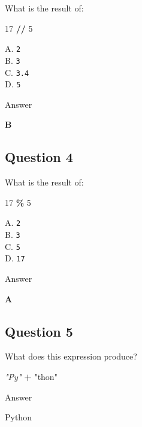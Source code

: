 \documentclass[
]{article}
\newenvironment{Shaded}{\begin{snugshade}}{\end{snugshade}}
\newcommand{\CommentTok}[1]{\textcolor[rgb]{0.56,0.35,0.01}{\textit{#1}}}
\newcommand{\DecValTok}[1]{\textcolor[rgb]{0.00,0.00,0.81}{#1}}
\newcommand{\NormalTok}[1]{#1}
\newcommand{\OperatorTok}[1]{\textcolor[rgb]{0.81,0.36,0.00}{\textbf{#1}}}
\newcommand{\StringTok}[1]{\textcolor[rgb]{0.31,0.60,0.02}{#1}}
\begin{document}
What is the result of:

\begin{Shaded}
\begin{Highlighting}[]
\DecValTok{17} \OperatorTok{//} \DecValTok{5}
\end{Highlighting}
\end{Shaded}

A. \texttt{2}\\
B. \texttt{3}\\
C. \texttt{3.4}\\
D. \texttt{5}

Answer

\textbf{B}

\subsection{Question 4}\label{question-4-4}

What is the result of:

\begin{Shaded}
\begin{Highlighting}[]
\DecValTok{17} \OperatorTok{\%} \DecValTok{5}
\end{Highlighting}
\end{Shaded}

A. \texttt{2}\\
B. \texttt{3}\\
C. \texttt{5}\\
D. \texttt{17}

Answer

\textbf{A}

\subsection{Question 5}\label{question-5-4}

What does this expression produce?

\begin{Shaded}
\begin{Highlighting}[]
\CommentTok{"Py"} \OperatorTok{+} \StringTok{"thon"}
\end{Highlighting}
\end{Shaded}

Answer

\begin{Shaded}
\begin{Highlighting}[]
\NormalTok{Python}
\end{Highlighting}
\end{Shaded}
\end{document}
